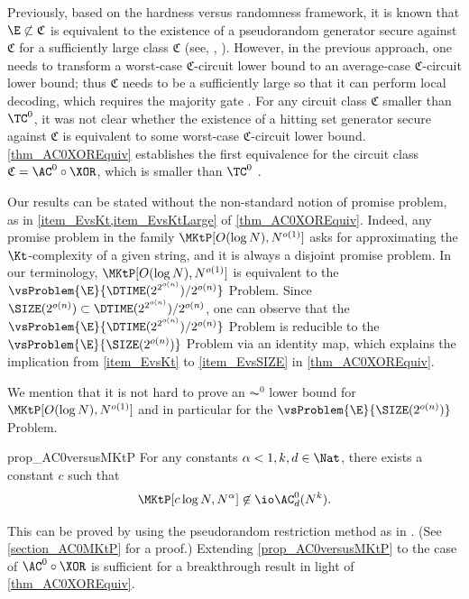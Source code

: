\documentclass{toc}
\begin{document}
Previously,
based on the hardness versus randomness framework,
it is known that $\E \not\subset \mathfrak{C}$ is equivalent to the existence of a pseudorandom generator secure against $\mathfrak{C}$
for a sufficiently large class $\mathfrak{C}$ (see, \eg, \cite{Fortnow01_coco_conf}).
However, in the previous approach, one needs to transform a worst-case $\mathfrak{C}$-circuit lower bound to an average-case $\mathfrak{C}$-circuit lower bound;
thus $\mathfrak{C}$ needs to be a sufficiently large so that it
can perform local decoding, which requires the majority gate \cite{ShaltielV10_siamcomp_journals}.
For any circuit class $\mathfrak{C}$ smaller than $\TC^0$,
it was not clear whether the existence of a hitting set generator secure against $\mathfrak{C}$ is equivalent to some worst-case $\mathfrak{C}$-circuit lower bound.
\cref{thm_AC0XOREquiv} establishes the first equivalence
for the circuit class $\mathfrak{C} = \AC^0 \circ \XOR$, which is smaller than $\TC^0$ \cite{Razborov87_lowerbound}.


%
%
%
%
%
Our results
can be stated without the non-standard notion of promise problem, as in \cref{item_EvsKt,item_EvsKtLarge} of \cref{thm_AC0XOREquiv}.
Indeed,
any promise problem in the family $\MKtP[O(\log N), N^{o(1)}]$
asks for approximating the $\Kt$-complexity of a given string,
and it is always a disjoint promise problem.
In our terminology,
$\MKtP[O(\log N), N^{o(1)}]$
is equivalent to the $\vsProblem{\E}{\DTIME(2^{2^{o(n)}})/2^{o(n)}}$ Problem.
Since $\SIZE(2^{o(n)}) \subset \DTIME(2^{2^{o(n)}})/2^{o(n)}$,
one can observe that
the $\vsProblem{\E}{\DTIME(2^{2^{o(n)}})/2^{o(n)}}$ Problem
is reducible to
the $\vsProblem{\E}{\SIZE(2^{o(n)})}$ Problem
via an identity map, which explains the implication from \cref{item_EvsKt} to \cref{item_EvsSIZE} in \cref{thm_AC0XOREquiv}.


%
We mention that it is not hard to prove an $\AC^0$ lower bound for
%
%
%
$\MKtP[O(\log N), N^{o(1)}]$     %
and in particular for the $\vsProblem{\E}{\SIZE(2^{o(n)})}$ Problem.
\begin{theoremref}
  {prop_AC0versusMKtP}
  For any constants $\alpha < 1, k, d \in \Nat$,
  there exists a constant $c$ such that
  $$\MKtP[c \log N, N^{\alpha}] \not\in \io \AC_d^0(N^k).$$
\end{theoremref}
This can be proved by using
the pseudorandom restriction method as in \cite{HiraharaS17_coco_conf, CheraghchiKLM19_icalp_conf, ChenHOPRS20_innovations_conf}.
(See \cref{section_AC0MKtP} for a proof.)
Extending \cref{prop_AC0versusMKtP} to the case of $\AC^0 \circ \XOR$
is sufficient for a breakthrough result in light of \cref{thm_AC0XOREquiv}.
\end{document}
